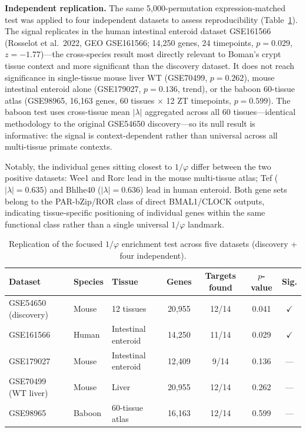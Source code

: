 \documentclass[11pt,letterpaper]{article}
\theoremstyle{definition}
\theoremstyle{remark}
\begin{document}
\textbf{Independent replication.} The same 5{,}000-permutation expression-matched test was applied to four independent datasets to assess reproducibility (Table~\ref{tab:replication}). The signal replicates in the human intestinal enteroid dataset GSE161566 (Rosselot et al.\ 2022, GEO GSE161566; 14{,}250 genes, 24 timepoints, $p = 0.029$, $z = -1.77$)---the cross-species result most directly relevant to Boman's crypt tissue context and more significant than the discovery dataset. It does not reach significance in single-tissue mouse liver WT (GSE70499, $p = 0.262$), mouse intestinal enteroid alone (GSE179027, $p = 0.136$, trend), or the baboon 60-tissue atlas (GSE98965, 16{,}163 genes, 60 tissues $\times$ 12 ZT timepoints, $p = 0.599$). The baboon test uses cross-tissue mean $|\lambda|$ aggregated across all 60 tissues---identical methodology to the original GSE54650 discovery---so its null result is informative: the signal is context-dependent rather than universal across all multi-tissue primate contexts.

Notably, the individual genes sitting closest to $1/\varphi$ differ between the two positive datasets: Wee1 and Rorc lead in the mouse multi-tissue atlas; Tef ($|\lambda| = 0.635$) and Bhlhe40 ($|\lambda| = 0.636$) lead in human enteroid. Both gene sets belong to the PAR-bZip/ROR class of direct BMAL1/CLOCK outputs, indicating tissue-specific positioning of individual genes within the same functional class rather than a single universal $1/\varphi$ landmark.

\begin{table}[H]
\centering
\caption{Replication of the focused $1/\varphi$ enrichment test across five datasets (discovery + four independent).}
\label{tab:replication}
\small
\begin{tabular}{lllcccc}
\toprule
\textbf{Dataset} & \textbf{Species} & \textbf{Tissue} & \textbf{Genes} & \textbf{Targets found} & \textbf{$p$-value} & \textbf{Sig.} \\
\midrule
GSE54650 (discovery) & Mouse & 12 tissues & 20{,}955 & 12/14 & 0.041 & $\checkmark$ \\
GSE161566            & Human & Intestinal enteroid & 14{,}250 & 11/14 & 0.029 & $\checkmark$ \\
GSE179027            & Mouse & Intestinal enteroid & 12{,}409 & 9/14  & 0.136 & --- \\
GSE70499 (WT liver)  & Mouse & Liver & 20{,}955 & 12/14 & 0.262 & --- \\
GSE98965             & Baboon & 60-tissue atlas & 16{,}163 & 12/14 & 0.599 & --- \\
\bottomrule
\end{tabular}
\end{table}
\end{document}
